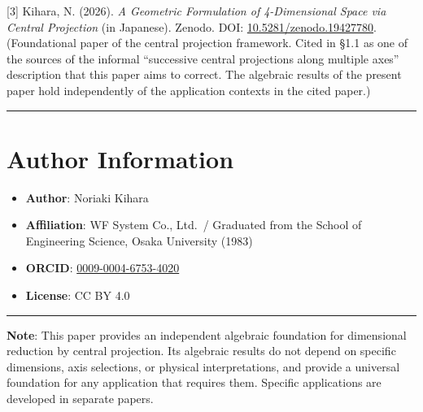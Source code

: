 \documentclass[a4paper,11pt]{article}
\theoremstyle{definition}
\theoremstyle{remark}
\providecommand{\tightlist}{%
  \setlength{\itemsep}{0pt}\setlength{\parskip}{0pt}}
\begin{document}
{[}3{]} Kihara, N. (2026). \emph{A Geometric Formulation of
4-Dimensional Space via Central Projection} (in Japanese). Zenodo. DOI:
\href{https://doi.org/10.5281/zenodo.19427780}{10.5281/zenodo.19427780}.
(Foundational paper of the central projection framework. Cited in §1.1
as one of the sources of the informal ``successive central projections
along multiple axes'' description that this paper aims to correct. The
algebraic results of the present paper hold independently of the
application contexts in the cited paper.)

\begin{center}\rule{0.5\linewidth}{0.5pt}\end{center}

\section{Author Information}\label{author-information}

\begin{itemize}
\tightlist
\item
  \textbf{Author}: Noriaki Kihara
\item
  \textbf{Affiliation}: WF System Co., Ltd.~/ Graduated from the School
  of Engineering Science, Osaka University (1983)
\item
  \textbf{ORCID}:
  \href{https://orcid.org/0009-0004-6753-4020}{0009-0004-6753-4020}
\item
  \textbf{License}: CC BY 4.0
\end{itemize}

\begin{center}\rule{0.5\linewidth}{0.5pt}\end{center}

\textbf{Note}: This paper provides an independent algebraic foundation
for dimensional reduction by central projection. Its algebraic results
do not depend on specific dimensions, axis selections, or physical
interpretations, and provide a universal foundation for any application
that requires them. Specific applications are developed in separate
papers.
\end{document}

